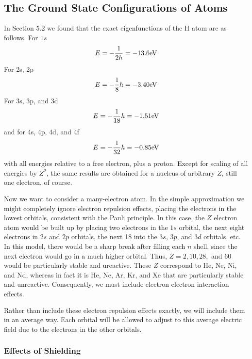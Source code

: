 \subsection{The Ground State Configurations of Atoms}

In Section 5.2 we found that the exact eigenfunctions of the H atom are as 
follows.  For $1s$
\begin{equation}
E = - {1 \over 2h} = - 13.6 {\rm eV}
\end{equation}
For 2s, 2p
\begin{equation}
E = - {1 \over 8} h = - 3.40 {\rm eV}
\end{equation}
For 3s, 3p, and 3d
\begin{equation}
E = - {1 \over 18} h = - 1.51 {\rm eV}
\end{equation}
and for 4s, 4p, 4d, and 4f
\begin{equation}
E = - {1 \over 32} h = - 0.85 {\rm eV}
\end{equation}
with all energies relative to a free electron, plus a proton.  Except for 
scaling of all energies by $Z^2$, the same results are obtained for a 
nucleus of arbitrary $Z$, still one electron, of course.

Now we want to consider a many-electron atom. In the simple
approximation we might completely ignore electron repulsion effects,
placing the electrons in the lowest orbitals, consistent with the
Pauli principle.  In this case, the $Z$ electron atom would be built
up by placing two electrons in the $1s$ orbital, the next eight
electrons in $2s$ and $2p$ orbitals, the next 18 into the $3s$, $3p$,
and $3d$ orbitals, etc.  In this model, there would be a sharp break
after filling each $n$ shell, since the next electron would go in a
much higher orbital. Thus, $Z = 2, 10, 28,$ and 60 would be
particularly stable and ureactive. These $Z$ correspond to He, Ne, Ni,
and Nd, whereas in fact it is He, Ne, Ar, Kr, and Xe that are
particularly stable and unreactive.  Consequently, we must include
electron-electron interaction effects.

Rather than include these electron repulsion effects exactly, we will 
include them in an average way.  Each orbital will be allowed to adjust to 
this average electric field due to the electrons in the other orbitals.

\subsubsection{Effects of Shielding}

